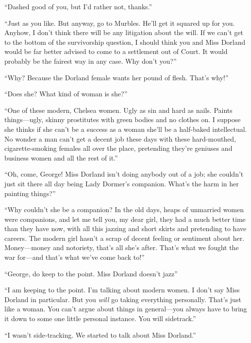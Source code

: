 \enquote{Dashed good of you, but I'd rather not, thanks.}

\enquote{Just as you like. But anyway, go to Murbles. He'll get it squared up for you. Anyhow, I don't think there will be any litigation about the will. If we can't get to the bottom of the survivorship question, I should think you and Miss Dorland would be far better advised to come to a settlement out of Court. It would probably be the fairest way in any case. Why don't you?}

\enquote{Why? Because the Dorland female wants her pound of flesh. That's why!}

\enquote{Does she? What kind of woman is she?}

\enquote{One of these modern, Chelsea women. Ugly as sin and hard as nails. Paints things\allowbreak---\allowbreak ugly, skinny prostitutes with green bodies and no clothes on. I suppose she thinks if she can't be a success as a woman she'll be a half-baked intellectual. No wonder a man can't get a decent job these days with these hard-mouthed, cigarette-smoking females all over the place, pretending they're geniuses and business women and all the rest of it.}

\enquote{Oh, come, George! Miss Dorland isn't doing anybody out of a job; she couldn't just sit there all day being Lady Dormer's companion. What's the harm in her painting things?}

\enquote{Why couldn't she be a companion? In the old days, heaps of unmarried women were companions, and let me tell you, my dear girl, they had a much better time than they have now, with all this jazzing and short skirts and pretending to have careers. The modern girl hasn't a scrap of decent feeling or sentiment about her. Money\allowbreak---\allowbreak money and notoriety, that's all she's after. That's what we fought the war for\allowbreak---\allowbreak and that's what we've come back to!}

\enquote{George, do keep to the point. Miss Dorland doesn't jazz\longdash}

\enquote{I am keeping to the point. I'm talking about modern women. I don't say Miss Dorland in particular. But you \textit{will} go taking everything personally. That's just like a woman. You can't argue about things in general\allowbreak---\allowbreak you always have to bring it down to some one little personal instance. You will sidetrack.}

\enquote{I wasn't side-tracking. We started to talk about Miss Dorland.}

